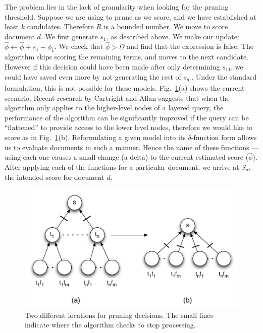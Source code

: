 \documentclass{sig-alternate}
\newcommand{\method}[1]{{\sc{#1}}}
\def\review#1{{\color{Cerulean} #1}}
\begin{document}
The problem lies in the lack of granularity when looking for the pruning threshold. Suppose we are using \method{maxscore} to prune as we score, and we have established at least $k$ candidates. Therefore $R$ is a bounded number. We move to score document $d$. We first generate $s_{1}$, as described above. We make our update: ${\hat \phi} \leftarrow {\hat \phi} + s_{1} - \phi_{1}$. We check that ${\hat \phi} > \Omega$ and find that the expression is false. The algorithm skips scoring the remaining terms, and moves to the next candidate. However if this decision could have been made after only determining $s_{11}$, we could have saved even more by not generating the rest of $s_{q_{1}}$. Under the standard formulation, this is not possible for these models. 
\review{Fig.~\ref{fig:mod}(a) shows the current scenario. Recent research by Cartright and Allan \cite{cartright-cikm-2011} suggests that when the \method{maxscore} algorithm only applies to the higher-level nodes of a layered query, the performance of the algorithm can be significantly improved if the query can be ``flattened'' to provide access to the lower level nodes, therefore we would like to score as in Fig.~\ref{fig:mod}(b). Reformulating a given model into its $\delta$-function form allows us to evaluate documents in such a manner. Hence the name of these functions --- using each one causes a small change (a delta) to the current estimated score (${\hat \phi}$). After applying each of the functions for a particular document, we arrive at $S_{d}$, the intended score for document $d$.}
\begin{figure}
\centering
\includegraphics[scale=0.45]{imgs/modification.pdf}
\caption{Two different locations for pruning decisions. The small lines indicate where the \method{maxscore} algorithm checks to stop processing.}
\label{fig:mod}
\end{figure}
 
\end{document}
